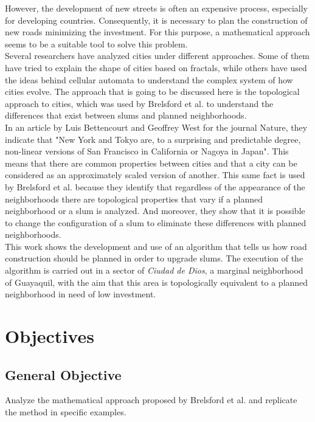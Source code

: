 \documentclass[10pt]{article}
\begin{document}
However, the development of new streets is often an expensive process, especially for developing countries. Consequently, it is necessary to plan the construction of new roads minimizing the investment. For this purpose, a mathematical approach seems to be a suitable tool to solve this problem\cite{bre}.\\

Several researchers have analyzed cities under different approaches. Some of them have tried to explain the shape of cities based on fractals, while others have used the ideas behind cellular automata to understand the complex system of how cities evolve\cite{d2019mathematics}. The approach that is going to be discussed here is the topological approach to cities, which was used by  Brelsford et al. to understand the differences that exist between slums and planned neighborhoods\cite{bre}.\\

In an article by Luis Bettencourt and Geoffrey West for the journal Nature, they indicate that "New York and Tokyo are, to a surprising and predictable degree, non-linear versions of San Francisco in California or Nagoya in Japan"\cite{bettencourt2010unified}. This means that there are common properties between cities and that a city can be considered as an approximately scaled version of another. This same fact is used by  Brelsford et al. because they identify that regardless of the appearance of the neighborhoods there are topological properties that vary if a planned neighborhood or a slum is analyzed\cite{bre}. And moreover, they show that it is possible to change the configuration of a slum to eliminate these differences with planned neighborhoods\cite{bre}.\\

This work shows the development and use of an algorithm that tells us how road construction should be planned in order to upgrade slums. The execution of the algorithm is carried out in a sector of \emph{Ciudad de Dios}, a marginal neighborhood of Guayaquil, with the aim that this area is topologically equivalent to a planned neighborhood in need of low investment.\\


\section{Objectives}
\subsection{General Objective}
Analyze the mathematical approach proposed by Brelsford et al. \cite{bre} and replicate the method in specific examples.
\end{document}
